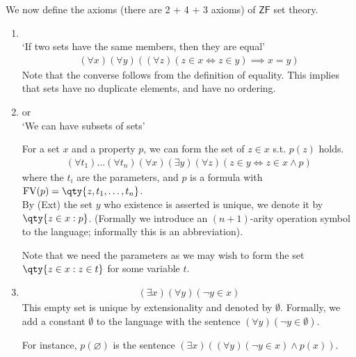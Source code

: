 We now define the axioms (there are 2 + 4 + 3 axioms) of $\mathsf{ZF}$ set theory.
\begin{enumerate}
    \item {} \\
    `If two sets have the same members, then they are equal'
    \begin{align*}
        (\forall x)(\forall y)((\forall z)(z \in x \Leftrightarrow z \in y) \implies x = y)
    \end{align*}
    Note that the converse follows from the definition of equality.
    This implies that sets have no duplicate elements, and have no ordering.

    \item {} or  \\
    `We can have subsets of sets'

    For a set $x$ and a property $p$, we can form the set of $z \in x$ s.t. $p(z)$ holds.
    \begin{align*}
        (\forall t_1)\dots(\forall t_n)(\forall x)(\exists y)(\forall z)(z \in y \Leftrightarrow z \in x \wedge p)
    \end{align*}
    where the $t_i$ are the parameters, and $p$ is a formula with $\FV(p) = \qty{z, t_1, \dots, t_n}$. \\
    By (Ext) the set $y$ who existence is asserted is unique, we denote it by $\qty{z \in x : p}$.
    (Formally we introduce an $(n + 1)$-arity operation symbol to the language; informally this is an abbreviation).

    \begin{example}
        Note that we need the parameters as we may wish to form the set $\qty{z \in x : z \in t}$ for some variable $t$.
    \end{example}
    \item {}
    \begin{align*}
        (\exists x)(\forall y)(\neg y \in x)
    \end{align*}
    This empty set is unique by extensionality and denoted by $\emptyset$.
    Formally, we add a constant $\emptyset$ to the language with the sentence $(\forall y)(\neg y \in \emptyset)$.

    \begin{example}
        For instance, $p(\varnothing)$ is the sentence $(\exists x)((\forall y)(\neg y \in x) \wedge p(x))$.
    \end{example}


\end{enumerate}
